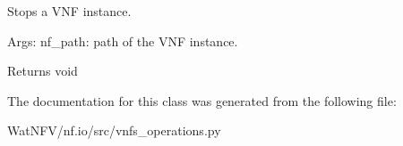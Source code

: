 Stops a V\-N\-F instance. 

Args\-: nf\-\_\-path\-: path of the V\-N\-F instance.

\begin{DoxyReturn}{Returns}
void 
\end{DoxyReturn}


The documentation for this class was generated from the following file\-:\begin{DoxyCompactItemize}
\item 
Wat\-N\-F\-V/nf.\-io/src/vnfs\-\_\-operations.\-py\end{DoxyCompactItemize}
